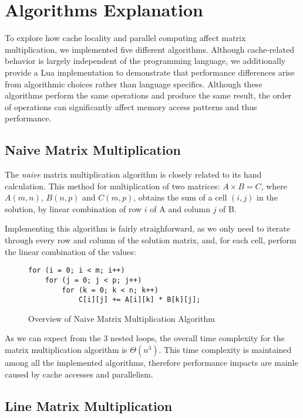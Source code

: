\section{Algorithms Explanation} \label{section:algorithms}

To explore how cache locality and parallel computing affect matrix multiplication, we implemented five different algorithms. Although cache-related behavior is largely independent of the programming language, we additionally provide a Lua implementation to demonstrate that performance differences arise from algorithmic choices rather than language specifics. Although these algorithms perform the same operations and produce the same result, the order of operations can significantly affect memory access patterns and thus performance.

\subsection{Naive Matrix Multiplication}

The \textit{naive} matrix multiplication algorithm is closely related to its hand calculation. This method for multiplication of two matrices: $A \times B = C$, where $A(m, n)$, $B(n, p)$ and $C(m, p)$, obtains the sum of a cell $(i,j)$ in the solution, by linear combination of row $i$ of A and column $j$ of B.

Implementing this algorithm is fairly straighforward, as we only need to iterate through every row and column of the solution matrix, and, for each cell, perform the linear combination of the values:

\begin{figure}[h!]
\begin{verbatim}
for (i = 0; i < m; i++)
    for (j = 0; j < p; j++)
        for (k = 0; k < n; k++)
            C[i][j] += A[i][k] * B[k][j];
\end{verbatim}
\caption{Overview of Naive Matrix Multiplication Algorithm}
\label{fig:algo:naive}
\end{figure}

As we can expect from the 3 nested loops, the overall time complexity for the matrix multiplication algorithm is $Θ(n^3)$. This time complexity is maintained among all the implemented algorithms, therefore performance impacts are mainle caused by cache accesses and parallelism.

\subsection{Line Matrix Multiplication}

